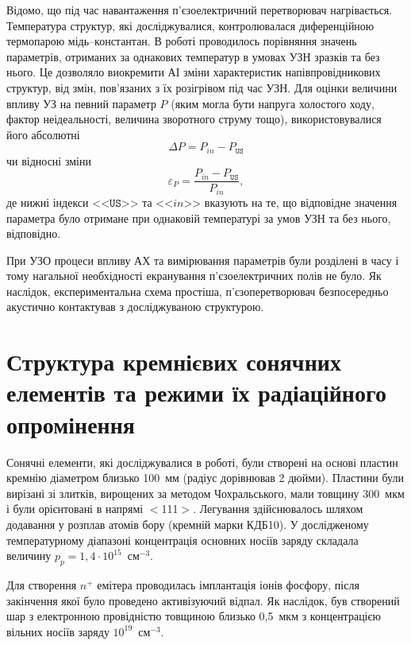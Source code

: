 Відомо, що під час навантаження п'єзоелектричний перетворювач нагрівається.
Температура структур, які досліджувалися, контролювалася диференційною термопарою мідь--константан.
В роботі проводилось порівняння значень параметрів, отриманих за однакових температур в умовах УЗН зразків та без нього.
Це дозволяло виокремити АІ зміни характеристик напівпровідникових структур, від змін, пов'язаних з їх розігрівом під час УЗН.
Для оцінки величини впливу УЗ на певний параметр $P$ (яким могла бути напруга холостого ходу, фактор неідеальності, величина зворотного струму тощо),
використовувалися його абсолютні
 \begin{equation}
 \label{eqAbsDelta}
\Delta P=P_{in}-P_\mathtt{US}
 \end{equation}
чи відносні зміни
 \begin{equation}
 \label{eqEpsDelta}
\varepsilon_P=\frac{P_{in}-P_\mathtt{US}}{P_{in}},
 \end{equation}
де нижні індекси <<$\mathtt{US}$>> та <<$in$>> вказують на те, що відповідне значення параметра було отримане при однаковій температурі за умов УЗН та без нього, відповідно.

При УЗО процеси впливу АХ та вимірювання параметрів були розділені в часу і тому нагальної необхідності екранування п'єзоелектричних полів не було.
Як наслідок, експериментальна схема простіша, п'єзоперетворювач безпосередньо акустично контактував з досліджуваною структурою.




\section{Структура кремнієвих сонячних елементів та режими їх радіаційного опромінення\label{SSC}}
Сонячні елементи, які досліджувалися в роботі, були створені на основі пластин кремнію діаметром близько 100~мм (радіус дорівнював 2 дюйми).
Пластини  були вирізані зі злитків, вирощених за методом Чохральського, мали товщину 300~мкм і були орієнтовані в напрямі $<$111$>$.
Легування здійснювалось шляхом додавання у розплав атомів бору (кремній марки КДБ10).
У дослідженому температурному діапазоні концентрація основних носіїв заряду складала величину $p_p=1,4\cdot10^{15}$~см$^{-3}$.

Для створення $n^+$ емітера проводилась імплантація іонів фосфору, після закінчення якої було проведено активізуючий відпал.
Як наслідок, був створений шар з електронною провідністю товщиною близько  0,5~мкм з концентрацією вільних носіїв заряду $10^{19}$~см$^{-3}$.

